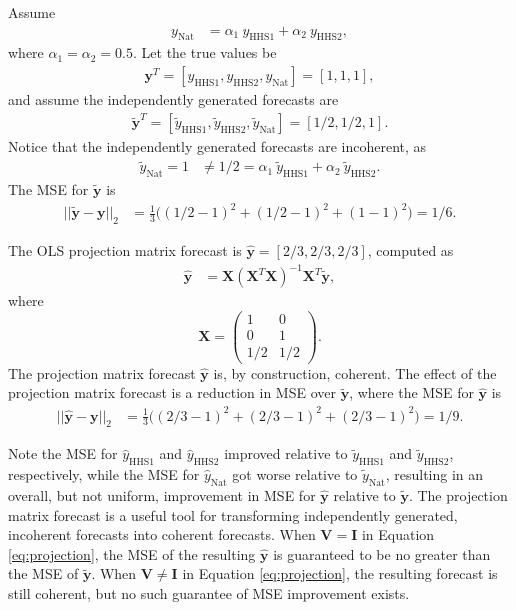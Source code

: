 \documentclass{umassthesis}          %
\begin{document}
Assume
\begin{align}
y_{\text{Nat}} &= \alpha_1 \ y_{\text{HHS1}} + \alpha_2 \ y_{\text{HHS2}},
\end{align}
\noindent where $\alpha_1 = \alpha_2 = 0.5$. Let the true values be
\begin{align}
\bm{y}^T = [y_{\text{HHS1}}, y_{\text{HHS2}} , y_{\text{Nat}}] = [1,1,1],
\end{align}
\noindent and assume the independently generated forecasts are
\begin{align}
\bm{\tilde{y}}^T = [\tilde{y}_{\text{HHS1}},\tilde{y}_{\text{HHS2}},\tilde{y}_{\text{Nat}}] = [1/2, 1/2, 1].
\end{align}
\noindent Notice that the independently generated forecasts are incoherent, as
\begin{align}
\tilde{y}_{\text{Nat}} = 1 & \neq 1/2 =  \alpha_1 \  \tilde{y}_{\text{HHS1}} + \alpha_2 \  \tilde{y}_{\text{HHS2}}.
\end{align}
\noindent The MSE for $\bm{\tilde{y}}$ is
\begin{align}
|| \bm{\tilde{y}} - \bm{y}||_2 &= \frac{1}{3}\Bigg((1/2 - 1)^2 + (1/2 - 1)^2 + (1-1)^2 \Bigg) = 1/6.
\end{align}

The OLS projection matrix forecast is $\bm{\hat{y}} = [2/3, 2/3, 2/3]$, computed as
\begin{align}
\bm{\hat{y}} &= \bm{X}(\bm{X}^T\bm{X})^{-1}\bm{X}^T\bm{\tilde{y}},
\end{align}
\noindent where $$\bm{X} = \begin{pmatrix} 1 & 0 \\ 0 & 1\\1/2 & 1/2 \end{pmatrix}.$$ The projection matrix forecast $\bm{\hat{y}}$ is, by construction, coherent. The effect of the projection matrix forecast is a reduction in MSE over $\bm{\tilde{y}}$, where the MSE for $\bm{\hat{y}} $ is
\begin{align}
|| \bm{\hat{y}} - \bm{y}||_2 &= \frac{1}{3}\Bigg((2/3 - 1)^2 + (2/3 - 1)^2 + (2/3-1)^2 \Bigg) = 1/9.
\end{align}

Note the MSE for $\hat{y}_{\text{HHS1}}$ and $\hat{y}_{\text{HHS2}}$ improved relative to $\tilde{y}_{\text{HHS1}}$ and $\tilde{y}_{\text{HHS2}}$, respectively, while the MSE for $\hat{y}_{\text{Nat}}$ got worse relative to $\tilde{y}_{\text{Nat}}$, resulting in an overall, but not uniform, improvement in MSE for $\hat{\bm{y}}$ relative to $\tilde{\bm{y}}$. The projection matrix forecast is a useful tool for transforming independently generated, incoherent forecasts into coherent forecasts. When $\bm{V}=\bm{I}$ in Equation \ref{eq:projection}, the MSE of the resulting $\bm{\hat{y}}$ is guaranteed to be no greater than the MSE of $\bm{\tilde{y}}$. When $\bm{V} \neq \bm{I}$ in Equation \ref{eq:projection}, the resulting forecast is still coherent, but no such guarantee of MSE improvement exists.
   
\end{document}

